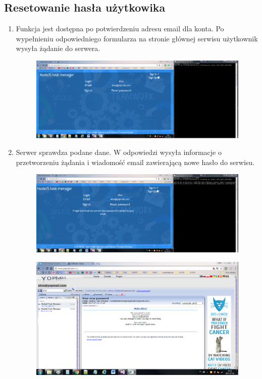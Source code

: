 \documentclass[12pt]{report}
\begin{document}
\begin{enumerate}
\begin{enumerate}
\subsection{Resetowanie hasła użytkowika}
\begin{enumerate}
\item Funkcja jest dostępna po potwierdzeniu adresu email dla konta. 
Po wypełnieniu odpowiedniego formularza na stronie głównej serwisu użytkownik wysyła żądanie do serwera.
\begin{figure}[!t]
\centering
\includegraphics{51.png}
\end{figure}
\item Serwer sprawdza podane dane. W odpowiedzi wysyła informacje o przetworzeniu żądania i wiadomość email zawierającą nowe hasło do serwisu.
\begin{figure}[!t]
\centering
\includegraphics{52.png}
\end{figure}
\begin{figure}[!t]
\centering
\includegraphics{53.png}
\end{figure}
\end{enumerate}


\end{enumerate}
\end{enumerate}
\end{document}
